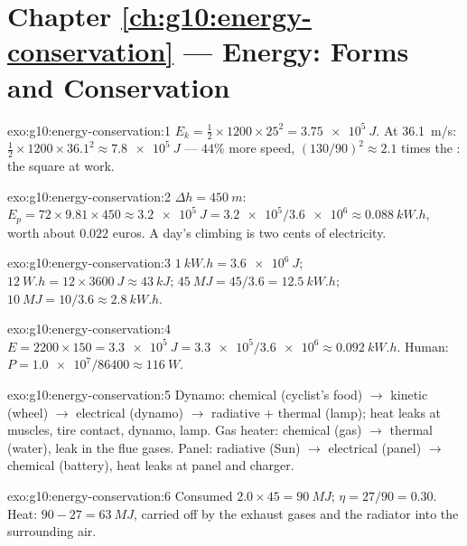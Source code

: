 \section*{Chapter \ref{ch:g10:energy-conservation} --- Energy: Forms and Conservation}

\begin{solution}{exo:g10:energy-conservation:1}
$E_k = \tfrac12 \times 1200 \times 25^2 = \qty{3.75e5}{J}$. At
\qty{36.1}{m/s}: $\tfrac12 \times 1200 \times 36.1^2 \approx
\qty{7.8e5}{J}$ --- $44\%$ more speed, $(130/90)^2 \approx 2.1$
times the : the square at work.
\end{solution}

\begin{solution}{exo:g10:energy-conservation:2}
$\Delta h = \qty{450}{m}$:
$E_p = 72 \times 9.81 \times 450 \approx \qty{3.2e5}{J}
= \num{3.2e5}/\num{3.6e6} \approx \qty{0.088}{kW.h}$, worth about
$0.022$ euros. A day's climbing is two cents of electricity.
\end{solution}

\begin{solution}{exo:g10:energy-conservation:3}
$\qty{1}{kW.h} = \qty{3.6e6}{J}$;
$\qty{12}{W.h} = 12 \times \qty{3600}{J} \approx \qty{43}{kJ}$;
$\qty{45}{MJ} = 45/3.6 = \qty{12.5}{kW.h}$;
$\qty{10}{MJ} = 10/3.6 \approx \qty{2.8}{kW.h}$.
\end{solution}

\begin{solution}{exo:g10:energy-conservation:4}
$E = 2200 \times 150 = \qty{3.3e5}{J}
= \num{3.3e5}/\num{3.6e6} \approx \qty{0.092}{kW.h}$. Human:
$P = \num{1.0e7}/\num{86400} \approx \qty{116}{W}$.
\end{solution}

\begin{solution}{exo:g10:energy-conservation:5}
Dynamo: chemical (cyclist's food) $\to$ kinetic (wheel) $\to$
electrical (dynamo) $\to$ radiative $+$ thermal (lamp); heat leaks
at muscles, tire contact, dynamo, lamp. Gas heater: chemical (gas)
$\to$ thermal (water), leak in the flue gases. Panel: radiative
(Sun) $\to$ electrical (panel) $\to$ chemical (battery), heat leaks
at panel and charger.
\end{solution}

\begin{solution}{exo:g10:energy-conservation:6}
Consumed $2.0 \times 45 = \qty{90}{MJ}$; $\eta = 27/90 = 0.30$.
Heat: $90 - 27 = \qty{63}{MJ}$, carried off by the exhaust gases
and the radiator into the surrounding air.
\end{solution}

